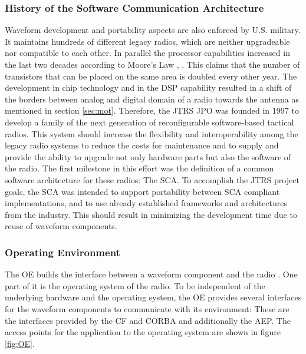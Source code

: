 \subsubsection{History of the Software Communication Architecture}
Waveform development and portability aspects are also enforced by U.S. military. It maintains hundreds of different legacy radios, which are neither upgradeable nor compatible to each other. In parallel the processor capabilities increased in the last two decades according to Moore's Law \cite{moores_law}, \cite{moores_law_2}. This claims that the number of transistors that can be placed on the same area is doubled every other year. The development in chip technology and in the DSP capability resulted in a shift of the borders between analog and digital domain of a radio towards the antenna as mentioned in section \ref{sec:mot}. Therefore, the \ac{JTRS} \ac{JPO} was founded in 1997 to develop a family of the next generation of reconfigurable software-based tactical radios. This system should increase the flexibility and interoperability among the legacy radio systems to reduce the costs for maintenance and to supply and provide the ability to upgrade not only hardware parts but also the software of the radio. The first milestone in this effort was the definition of a common software architecture for these radios: The \ac{SCA}. To accomplish the \ac{JTRS} project goals, the SCA was intended to support portability between SCA compliant implementations, and to use already established frameworks and architectures from the industry. This should result in minimizing the development time due to reuse of waveform components.

\subsubsection{Operating Environment}
The \ac{OE} builds the interface between a waveform component and the radio \cite{SCA_Tutorial_VT}. One part of it is the operating system of the radio. To be independent of the underlying hardware and the operating system, the \ac{OE} provides several interfaces for the waveform components to communicate with its environment: These are the interfaces provided by the \acl{CF} and CORBA and additionally the \ac{AEP}. The access points for the application to the operating system are shown in figure \ref{fig:OE}.

